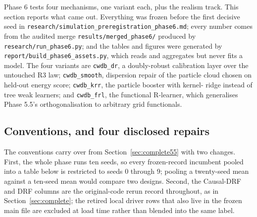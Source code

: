 Phase 6 tests four mechanisms, one variant each, plus the realism track. This
section reports what came out. Everything was frozen before the first decisive
seed in \texttt{research/simulation\_preregistration\_phase6.md}; every number
comes from the audited merge \texttt{results/merged\_phase6/} produced by
\texttt{research/run\_phase6.py}; and the tables and figures were generated by
\texttt{report/build\_phase6\_assets.py}, which reads and aggregates but never
fits a model. The four variants are \texttt{cwdb\_dr}, a doubly-robust
calibration layer over the untouched R3 law;
\texttt{cwdb\_smooth}, dispersion repair of the particle cloud chosen on
held-out energy score; \texttt{cwdb\_krr}, the particle booster with kernel-
ridge instead of tree weak learners; and \texttt{cwdb\_frl}, the functional
R-learner, which generalises Phase 5.5's orthogonalisation to arbitrary grid
functionals.

\subsection{Conventions, and four disclosed repairs}
\label{sub:p6-conventions}

The conventions carry over from Section~\ref{sec:complete55} with two changes.
First, the whole phase runs ten seeds, so every frozen-record incumbent pooled
into a table below is restricted to seeds 0 through 9; pooling a twenty-seed
mean against a ten-seed mean would compare two designs. Second, the
Causal-DRF and DRF columns are the original-code rerun record throughout, as
in Section~\ref{sec:complete}; the retired local driver rows that also live in
the frozen main file are excluded at load time rather than blended into the
same label.


